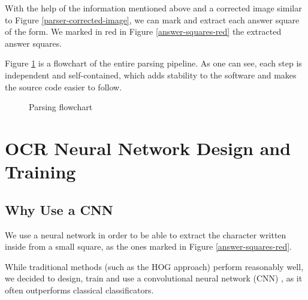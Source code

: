 \documentclass[11pt, a4paper]{report}
\begin{document}
With the help of the information mentioned above and a corrected image similar to Figure \ref{parser-corrected-image}, we can mark and extract each answer square of the form. We marked in red in Figure \ref{answer-squares-red} the extracted answer squares.

Figure \ref{parsing-flow} is a flowchart of the entire parsing pipeline. As one can see, each step is independent and self-contained, which adds stability to the software and makes the source code easier to follow. 

\begin{figure}[!h]
	\centering
	\caption{Parsing flowchart}
	\label{parsing-flow}
\end{figure}



\chapter{OCR Neural Network Design and Training}
\label{chapter-ocr-neural-network}

\section{Why Use a CNN}

We use a neural network in order to be able to extract the character written inside from a small square, as the ones marked in Figure \ref{answer-squares-red}.

While traditional methods (such as the HOG \cite{HOG} approach) perform reasonably well, we decided to design, train and use a convolutional neural network (CNN) \cite{CNN}, as it often outperforms classical classificators.
\end{document}
